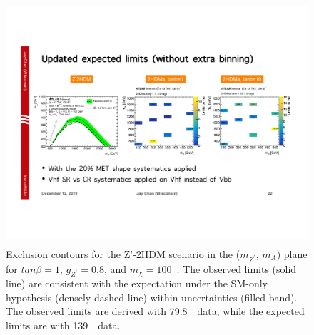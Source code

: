 \begin{figure}[!htb]
    \centering
    \includegraphics[width=12cm, height=9cm, trim={2.5cm 7.5cm 17.6cm 8cm}, clip]{chapters/c9/figures/ZPrime2HDMLimit-139Exp.pdf}
    \caption{Exclusion contours for the Z'-2HDM scenario in the ($m_{Z^{\prime}}$, $m_{A}$) plane for $tan\beta= 1$, $g_{Z^{\prime}}=0.8$, and $m_{\chi}=100$~\GeV. 
    The observed limits (solid line) are consistent with the expectation under the SM-only hypothesis (densely dashed line) within uncertainties (filled band). 
    The observed limits are derived with 79.8~\ifb~data, while the expected limits are with 139~\ifb~data.}
    \label{fig:zprime-2hdm-limit-139}
\end{figure}
